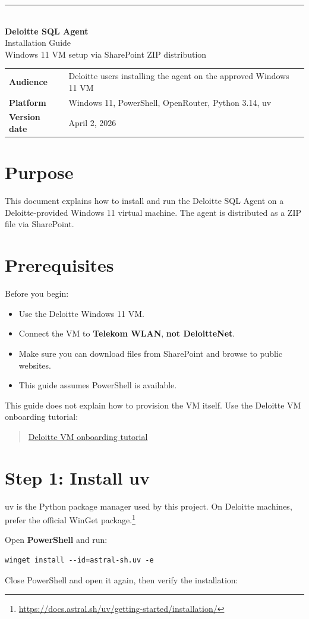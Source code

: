 \documentclass[11pt,a4paper]{article}
\newcommand{\guidecover}{%
    \begin{titlepanel}
    {\color{DeloitteGreen}\rule{\linewidth}{1.5pt}}\\[1.2em]
    {\Huge\bfseries\color{white}Deloitte SQL Agent}\\[0.35em]
    {\LARGE\color{white}Installation Guide}\\[1em]
    {\large\color{white!85}Windows 11 VM setup via SharePoint ZIP distribution}\\[2.2em]
    {\color{white!88}
    \begin{tabular}{>{\bfseries}p{3.2cm}p{9.5cm}}
    Audience & Deloitte users installing the agent on the approved Windows 11 VM \\
    Platform & Windows 11, PowerShell, OpenRouter, Python 3.14, uv \\
    Version date & April 2, 2026 \\
    \end{tabular}
    }
    \end{titlepanel}
    \vspace{1.2em}
}
\begin{document}
\guidecover

\section{Purpose}

This document explains how to install and run the Deloitte SQL Agent on a Deloitte-provided Windows 11 virtual machine. The agent is distributed as a ZIP file via SharePoint.

\section{Prerequisites}

Before you begin:

\begin{itemize}[leftmargin=1.5em]
    \item Use the Deloitte Windows 11 VM.
    \item Connect the VM to \textbf{Telekom WLAN}, \textbf{not DeloitteNet}.
    \item Make sure you can download files from SharePoint and browse to public websites.
    \item This guide assumes PowerShell is available.
\end{itemize}

This guide does not explain how to provision the VM itself. Use the Deloitte VM onboarding tutorial:

\begin{quote}
\href{https://deloitteemea.service-now.com/mysupport?id=sc_cat_item&sys_id=4e02d262c3a7c2145608282ce00131bf&table=sc_cat_item&searchTerm=VMware%20Workstation%20Player}{Deloitte VM onboarding tutorial}
\end{quote}

\section{Step 1: Install uv}

uv is the Python package manager used by this project. On Deloitte machines, prefer the official WinGet package.\footnote{\url{https://docs.astral.sh/uv/getting-started/installation/}}

Open \textbf{PowerShell} and run:

\begin{lstlisting}
winget install --id=astral-sh.uv -e
\end{lstlisting}

Close PowerShell and open it again, then verify the installation:
\end{document}
